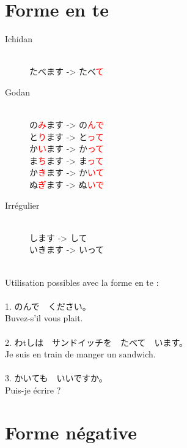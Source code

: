 \documentclass[11pt]{report}
\newenvironment{Japanese}{%
\CJKfamily{min}%
\CJKtilde  
\CJKnospace}{}
\begin{document}
\section{Forme en te}

\begin{CJK}{UTF8}{}  
\begin{Japanese}
	\begin{description}
		\item[Ichidan] \hfill \\
			たべます -> たべ\textcolor{red}{て}
		\item[Godan] \hfill \\
			の\textcolor{red}{み}ます -> の\textcolor{red}{んで} \\
			と\textcolor{red}{り}ます -> と\textcolor{red}{って} \\
			か\textcolor{red}{い}ます -> か\textcolor{red}{って} \\
			ま\textcolor{red}{ち}ます -> ま\textcolor{red}{って} \\
			か\textcolor{red}{き}ます -> か\textcolor{red}{いて} \\
			ぬ\textcolor{red}{ぎ}ます -> ぬ\textcolor{red}{いで}
		\item[Irrégulier] \hfill \\
			します -> して \\
			いきます -> いって
	\end{description}
	\hfill \\
	Utilisation possibles avec la forme en te : \\ \\
	1. のんで　ください。 \\
	Buvez-s'il vous plait. \\ \\
	2. わtしは　サンドイッチを　たべて　います。 \\
	Je suis en train de manger un sandwich. \\ \\
	3. かいても　いいですか。 \\
	Puis-je écrire ?
\end{Japanese}  
\end{CJK}

\section{Forme négative}
\end{document}

